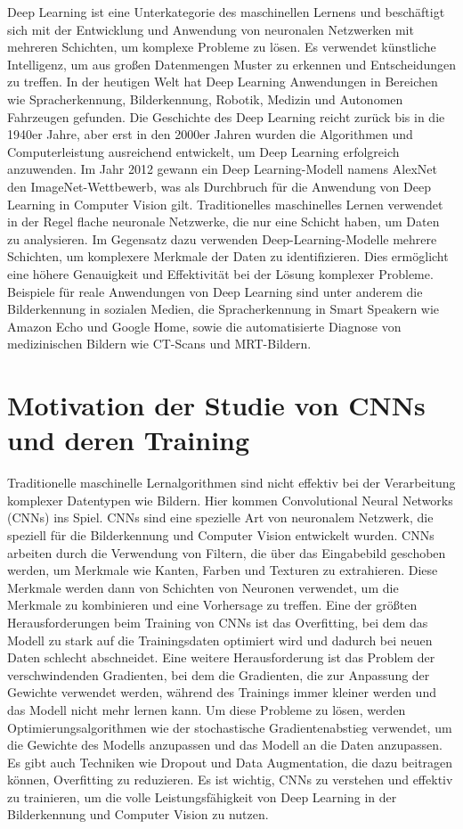     Deep Learning ist eine Unterkategorie des maschinellen Lernens und beschäftigt sich mit der Entwicklung und Anwendung von neuronalen Netzwerken mit mehreren Schichten, um komplexe Probleme zu lösen. Es verwendet künstliche Intelligenz, um aus großen Datenmengen Muster zu erkennen und Entscheidungen zu treffen. 
    In der heutigen Welt hat Deep Learning Anwendungen in Bereichen wie Spracherkennung, Bilderkennung, Robotik, Medizin und Autonomen Fahrzeugen gefunden. 
    Die Geschichte des Deep Learning reicht zurück bis in die 1940er Jahre, aber erst in den 2000er Jahren wurden die Algorithmen und Computerleistung ausreichend entwickelt, um Deep Learning erfolgreich anzuwenden. 
    Im Jahr 2012 gewann ein Deep Learning-Modell namens AlexNet den ImageNet-Wettbewerb, was als Durchbruch für die Anwendung von Deep Learning in Computer Vision gilt.
    Traditionelles maschinelles Lernen verwendet in der Regel flache neuronale Netzwerke, die nur eine Schicht haben, um Daten zu analysieren. 
    Im Gegensatz dazu verwenden Deep-Learning-Modelle mehrere Schichten, um komplexere Merkmale der Daten zu identifizieren. 
    Dies ermöglicht eine höhere Genauigkeit und Effektivität bei der Lösung komplexer Probleme.
    Beispiele für reale Anwendungen von Deep Learning sind unter anderem die Bilderkennung in sozialen Medien, die Spracherkennung in Smart Speakern wie Amazon Echo und Google Home, sowie die automatisierte Diagnose von medizinischen Bildern wie CT-Scans und MRT-Bildern.

\section{Motivation der Studie von CNNs und deren Training}
    
    Traditionelle maschinelle Lernalgorithmen sind nicht effektiv bei der Verarbeitung komplexer Datentypen wie Bildern. Hier kommen Convolutional Neural Networks (CNNs) ins Spiel. 
    CNNs sind eine spezielle Art von neuronalem Netzwerk, die speziell für die Bilderkennung und Computer Vision entwickelt wurden. 
    CNNs arbeiten durch die Verwendung von Filtern, die über das Eingabebild geschoben werden, um Merkmale wie Kanten, Farben und Texturen zu extrahieren. 
    Diese Merkmale werden dann von Schichten von Neuronen verwendet, um die Merkmale zu kombinieren und eine Vorhersage zu treffen. 
    Eine der größten Herausforderungen beim Training von CNNs ist das Overfitting, bei dem das Modell zu stark auf die Trainingsdaten optimiert wird und dadurch bei neuen Daten schlecht abschneidet. 
    Eine weitere Herausforderung ist das Problem der verschwindenden Gradienten, bei dem die Gradienten, die zur Anpassung der Gewichte verwendet werden, während des Trainings immer kleiner werden und das Modell nicht mehr lernen kann. 
    Um diese Probleme zu lösen, werden Optimierungsalgorithmen wie der stochastische Gradientenabstieg verwendet, um die Gewichte des Modells anzupassen und das Modell an die Daten anzupassen. 
    Es gibt auch Techniken wie Dropout und Data Augmentation, die dazu beitragen können, Overfitting zu reduzieren. 
    Es ist wichtig, CNNs zu verstehen und effektiv zu trainieren, um die volle Leistungsfähigkeit von Deep Learning in der Bilderkennung und Computer Vision zu nutzen. 
    
